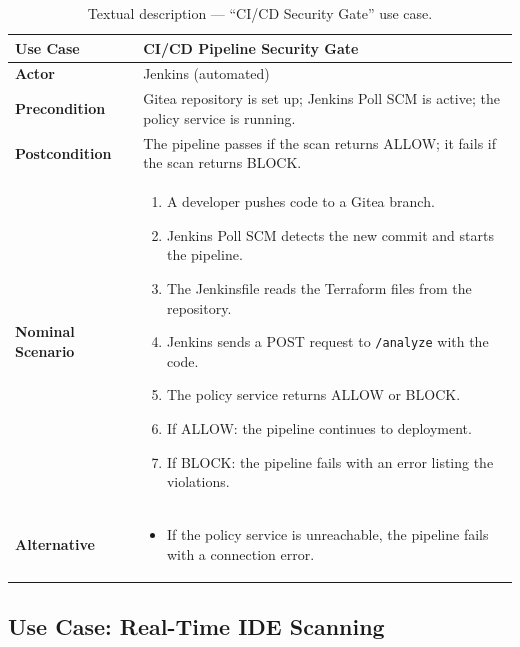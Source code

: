 \begin{table}[H]
\centering
\begin{tabularx}{\textwidth}{|l|X|}
\hline
\textbf{Use Case} & CI/CD Pipeline Security Gate \\
\hline
\textbf{Actor} & Jenkins (automated) \\
\hline
\textbf{Precondition} & Gitea repository is set up; Jenkins Poll SCM is active; the policy service is running. \\
\hline
\textbf{Postcondition} & The pipeline passes if the scan returns ALLOW; it fails if the scan returns BLOCK. \\
\hline
\textbf{Nominal Scenario} &
  \begin{enumerate}[leftmargin=0.8cm, nosep]
    \item A developer pushes code to a Gitea branch.
    \item Jenkins Poll SCM detects the new commit and starts the pipeline.
    \item The Jenkinsfile reads the Terraform files from the repository.
    \item Jenkins sends a POST request to \texttt{/analyze} with the code.
    \item The policy service returns ALLOW or BLOCK.
    \item If ALLOW: the pipeline continues to deployment.
    \item If BLOCK: the pipeline fails with an error listing the violations.
  \end{enumerate} \\
\hline
\textbf{Alternative} &
  \begin{itemize}[leftmargin=0.8cm, nosep]
    \item[A1.] If the policy service is unreachable, the pipeline fails with a connection error.
  \end{itemize} \\
\hline
\end{tabularx}
\caption{Textual description --- ``CI/CD Security Gate'' use case.}
\label{tab:uc-cicd}
\end{table}

\subsection{Use Case: Real-Time IDE Scanning}

